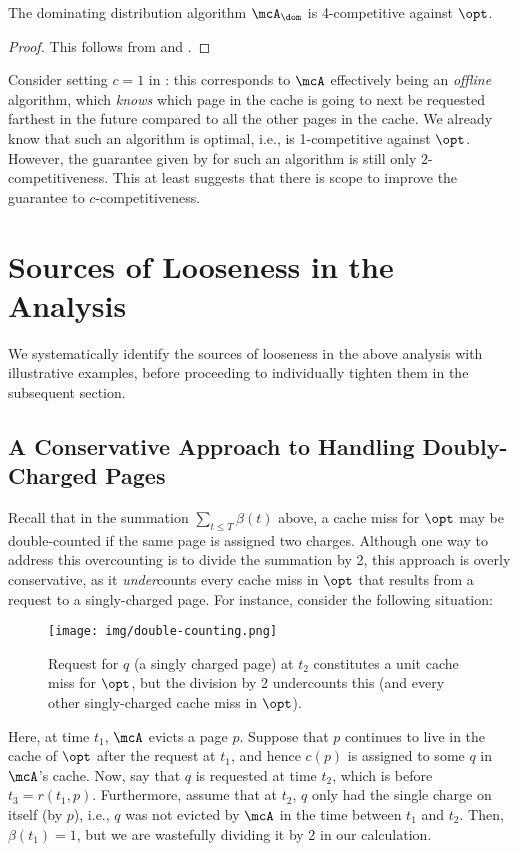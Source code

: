 \documentclass[11pt]{article}
\begin{document}
\begin{corollary}
    \label{corollary:dom-is-4-competitive}
    The dominating distribution algorithm $\mcA_\dom$ is 4-competitive against $\opt$.
\end{corollary}
\begin{proof}
    This follows from  and .
\end{proof}

\begin{remark}
    \label{remark:suboptimal-fifo}
    Consider setting $c=1$ in : this corresponds to $\mcA$ effectively being an \textit{offline} algorithm, which \textit{knows} which page in the cache is going to next be requested farthest in the future compared to all the other pages in the cache. We already know that such an algorithm is optimal, i.e., is 1-competitive against $\opt$. However, the guarantee given by  for such an algorithm is still only $2$-competitiveness. This at least suggests that there is scope to improve the guarantee to $c$-competitiveness. \end{remark}
 \section{Sources of Looseness in the Analysis}
\label{sec:looseness}
We systematically identify the sources of looseness in the above analysis with illustrative examples, before proceeding to individually tighten them in the subsequent section.

\subsection{A Conservative Approach to Handling Doubly-Charged Pages}
\label{sec:looseness-double-counting}

Recall that in the summation $\sum_{t \le T} \beta(t)$ above, a cache miss for $\opt$ may be double-counted if the same page is assigned two charges. Although one way to address this overcounting is to divide the summation by 2, this approach is overly conservative, as it \textit{under}counts every cache miss in $\opt$ that results from a request to a singly-charged page. For instance, consider the following situation:
\begin{figure}[H]
    \centering
    \texttt{[image: img/double-counting.png]}
    \caption{Request for $q$ (a singly charged page) at $t_2$ constitutes a unit cache miss for $\opt$, but the division by 2 undercounts this (and every other singly-charged cache miss in $\opt$).}
    \label{fig:double-counting}
\end{figure}
Here, at time $t_1$, $\mcA$ evicts a page $p$. Suppose that $p$ continues to live in the cache of $\opt$ after the request at $t_1$, and hence $c(p)$ is assigned to some $q$ in $\mcA$'s cache. Now, say that $q$ is requested at time $t_2$, which is before $t_3=r(t_1, p)$. Furthermore, assume that at $t_2$, $q$ only had the single charge on itself (by $p$), i.e., $q$ was not evicted by $\mcA$ in the time between $t_1$ and $t_2$. Then, $\beta(t_1)=1$, but we are wastefully dividing it by 2 in our calculation.
\end{document}
